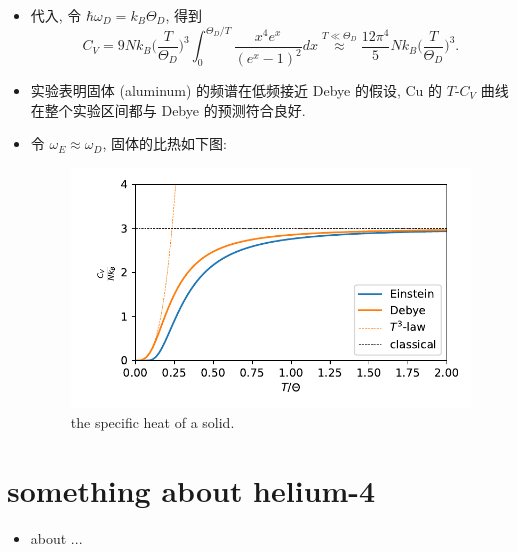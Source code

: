 \begin{itemize}
	\item 代入, 令 $\hbar \omega_D = k_B \Theta_D$, 得到
	\begin{equation}
		C_V = 9 N k_B \Big( \frac{T}{\Theta_D} \Big)^3 \int_0^{\Theta_D / T} \frac{x^4 e^x}{(e^x - 1)^2} dx \overset{T \ll \Theta_D}{\approx} \frac{12 \pi^4}{5} N k_B \Big( \frac{T}{\Theta_D} \Big)^3.
	\end{equation}
	
	\item 实验表明固体 (aluminum) 的频谱在低频接近 Debye 的假设, Cu 的 $T$-$C_V$ 曲线在整个实验区间都与 Debye 的预测符合良好.
	
	\item 令 $\omega_E \approx \omega_D$, 固体的比热如下图:
	
	\begin{figure}[H]
		\centering
		\includegraphics[scale=0.8]{figures/the specific heat of a solid.pdf}
		\caption{the specific heat of a solid.}
		\label{figure 7.3}
	\end{figure}
\end{itemize}

\section{something about helium-4}
\begin{itemize}
	\item about ...
\end{itemize}
